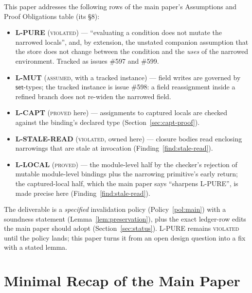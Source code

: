 \documentclass[11pt]{article}
\begin{document}
This paper addresses the following rows of the main paper's Assumptions
and Proof Obligations table (its \S 8):
\begin{itemize}
\item \textbf{L-PURE} (\textsc{violated}) — ``evaluating a condition does
  not mutate the narrowed locals'', and, by extension, the unstated
  companion assumption that the store does not change between the
  condition and the \emph{uses} of the narrowed environment. Tracked as
  issues \#597 and \#599.
\item \textbf{L-MUT} (\textsc{assumed}, with a tracked instance) — field
  writes are governed by $\mathsf{set}$-types; the tracked instance is
  issue \#598: a field reassignment inside a refined branch does not
  re-widen the narrowed field.
\item \textbf{L-CAPT} (\textsc{proved} here) — assignments to captured
  locals are checked against the binding's declared type
  (Section~\ref{sec:capt-proof}).
\item \textbf{L-STALE-READ} (\textsc{violated}, owned here) — closure
  bodies read enclosing narrowings that are stale at invocation
  (Finding~\ref{find:stale-read}).
\item \textbf{L-LOCAL} (\textsc{proved}) — the module-level half by the
  checker's rejection of mutable module-level bindings plus the
  narrowing primitive's early return; the captured-local half, which the
  main paper says ``sharpens L-PURE'', is made precise here
  (Finding~\ref{find:stale-read}).
\end{itemize}
The deliverable is a \emph{specified} invalidation policy
(Policy~\ref{pol:main}) with a soundness statement
(Lemma~\ref{lem:preservation}), plus the exact ledger-row edits the main
paper should adopt (Section~\ref{sec:status}). L-PURE remains
\textsc{violated} until the policy lands; this paper turns it from an open
design question into a fix with a stated lemma.

\section{Minimal Recap of the Main Paper}
\label{sec:recap}
\end{document}
